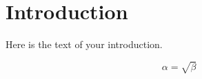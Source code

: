 \documentclass{article}
\begin{document}

\pagebreak


\tableofcontents






\pagebreak






\section{Introduction}
Here is the text of your introduction.


						

\begin{equation}
    \label{simple_equation}
    \alpha = \sqrt{ \beta }
\end{equation}

\hfill \\
\end{document}
